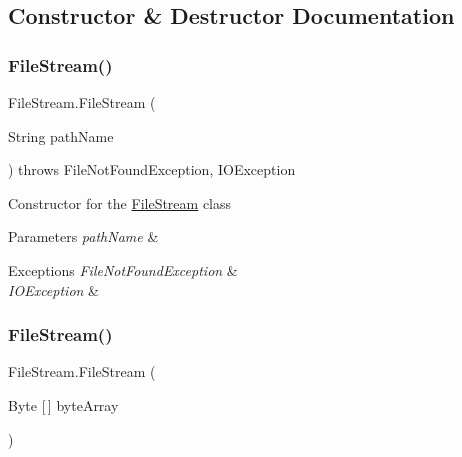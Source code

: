 \subsection{Constructor \& Destructor Documentation}
\mbox{\label{class_file_stream_a120b1fd6e4c74e93199d063da1c65b98}} 
\subsubsection{\texorpdfstring{File\+Stream()}{FileStream()}\hspace{0.1cm}{\footnotesize\ttfamily [1/3]}}
{\footnotesize\ttfamily File\+Stream.\+File\+Stream (\begin{DoxyParamCaption}\item[{String}]{path\+Name }\end{DoxyParamCaption}) throws File\+Not\+Found\+Exception, I\+O\+Exception\hspace{0.3cm}{\ttfamily [inline]}}

Constructor for the \mbox{\hyperlink{class_file_stream}{File\+Stream}} class 
\begin{DoxyParams}{Parameters}
{\em path\+Name} & \\
\hline
\end{DoxyParams}

\begin{DoxyExceptions}{Exceptions}
{\em File\+Not\+Found\+Exception} & \\
\hline
{\em I\+O\+Exception} & \\
\hline
\end{DoxyExceptions}
\mbox{\label{class_file_stream_a69fed4812620e26c3fd23560993bf7b3}} 
\subsubsection{\texorpdfstring{File\+Stream()}{FileStream()}\hspace{0.1cm}{\footnotesize\ttfamily [2/3]}}
{\footnotesize\ttfamily File\+Stream.\+File\+Stream (\begin{DoxyParamCaption}\item[{Byte \mbox{[}$\,$\mbox{]}}]{byte\+Array }\end{DoxyParamCaption})\hspace{0.3cm}{\ttfamily [inline]}}

